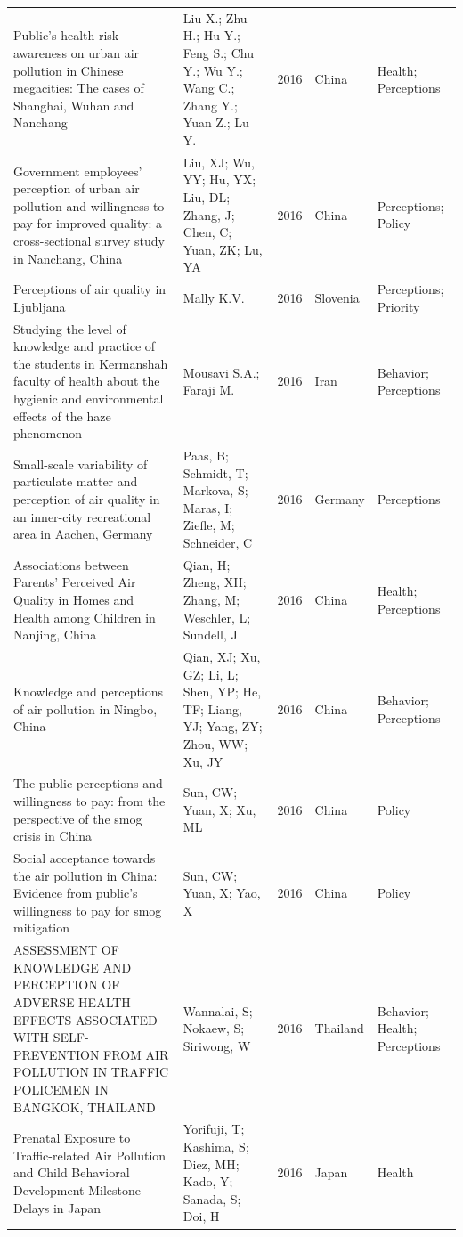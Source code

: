 {\begin{longtable}[t]{p{6cm}p{3cm}lp{3cm}p{3cm}}
\addlinespace
Public's health risk awareness on urban air pollution in Chinese megacities: The cases of Shanghai, Wuhan and Nanchang & Liu X.; Zhu H.; Hu Y.; Feng S.; Chu Y.; Wu Y.; Wang C.; Zhang Y.; Yuan Z.; Lu Y. & 2016 & China & Health; Perceptions\\
Government employees' perception of urban air pollution and willingness to pay for improved quality: a cross-sectional survey study in Nanchang, China & Liu, XJ; Wu, YY; Hu, YX; Liu, DL; Zhang, J; Chen, C; Yuan, ZK; Lu, YA & 2016 & China & Perceptions; Policy\\
Perceptions of air quality in Ljubljana & Mally K.V. & 2016 & Slovenia & Perceptions; Priority\\
Studying the level of knowledge and practice of the students in Kermanshah faculty of health about the hygienic and environmental effects of the haze phenomenon & Mousavi S.A.; Faraji M. & 2016 & Iran & Behavior; Perceptions\\
Small-scale variability of particulate matter and perception of air quality in an inner-city recreational area in Aachen, Germany & Paas, B; Schmidt, T; Markova, S; Maras, I; Ziefle, M; Schneider, C & 2016 & Germany & Perceptions\\
\addlinespace
Associations between Parents' Perceived Air Quality in Homes and Health among Children in Nanjing, China & Qian, H; Zheng, XH; Zhang, M; Weschler, L; Sundell, J & 2016 & China & Health; Perceptions\\
Knowledge and perceptions of air pollution in Ningbo, China & Qian, XJ; Xu, GZ; Li, L; Shen, YP; He, TF; Liang, YJ; Yang, ZY; Zhou, WW; Xu, JY & 2016 & China & Behavior; Perceptions\\
The public perceptions and willingness to pay: from the perspective of the smog crisis in China & Sun, CW; Yuan, X; Xu, ML & 2016 & China & Policy\\
Social acceptance towards the air pollution in China: Evidence from public's willingness to pay for smog mitigation & Sun, CW; Yuan, X; Yao, X & 2016 & China & Policy\\
ASSESSMENT OF KNOWLEDGE AND PERCEPTION OF ADVERSE HEALTH EFFECTS ASSOCIATED WITH SELF-PREVENTION FROM AIR POLLUTION IN TRAFFIC POLICEMEN IN BANGKOK, THAILAND & Wannalai, S; Nokaew, S; Siriwong, W & 2016 & Thailand & Behavior; Health; Perceptions\\
\addlinespace
Prenatal Exposure to Traffic-related Air Pollution and Child Behavioral Development Milestone Delays in Japan & Yorifuji, T; Kashima, S; Diez, MH; Kado, Y; Sanada, S; Doi, H & 2016 & Japan & Health\\

\end{longtable}}
